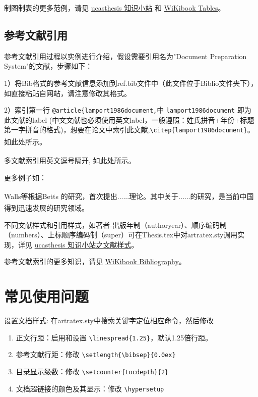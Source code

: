 {制图制表的更多范例，请见 \href{https://github.com/mohuangrui/ucasthesis/wiki}{ucasthesis 知识小站} 和 \href{https://en.wikibooks.org/wiki/LaTeX/Tables}{WiKibook Tables}。

\subsection{参考文献引用}

参考文献引用过程以实例进行介绍，假设需要引用名为"Document Preparation System"的文献，步骤如下：

1）将Bib格式的参考文献信息添加到ref.bib文件中（此文件位于Biblio文件夹下），如直接粘贴自网站，请注意修改其格式。

2）索引第一行 \verb|@article{lamport1986document,|中 \verb|lamport1986document| 即为此文献的label (中文文献也必须使用英文label，一般遵照：姓氏拼音+年份+标题第一字拼音的格式)，想要在论文中索引此文献,\verb|\citep{lamport1986document}|。如此处所示\textsuperscript{\citep{lamport1986document}}。

多文献索引用英文逗号隔开, 如此处所示\textsuperscript{\citep{lamport1986document, chu2004tushu, chen2005zhulu}}。

更多例子如：

Walls等\textsuperscript{\citep{walls2013drought}}根据Betts\textsuperscript{\citep{betts2005aging}} 的研究，首次提出......理论。其中关于......的研究\textsuperscript{}，是当前中国得到迅速发展的研究领域\textsuperscript{\citep{chen1980zhongguo, bravo1990comparative}}。

不同文献样式和引用样式，如著者-出版年制（authoryear）、顺序编码制（numbers）、上标顺序编码制（super）可在Thesis.tex中对artratex.sty调用实现，详见 \href{https://github.com/mohuangrui/ucasthesis/wiki}{ucasthesis 知识小站之文献样式}。


参考文献索引的更多知识，请见 \href{https://en.wikibooks.org/wiki/LaTeX/Bibliography_Management}{WiKibook Bibliography}。\nocite{*}%

\section{常见使用问题}\label{sec:qa}

设置文档样式: 在artratex.sty中搜索关键字定位相应命令，然后修改
\begin{enumerate}
    \item 正文行距：启用和设置 \verb|\linespread{1.25}|，默认1.25倍行距。
    \item 参考文献行距：修改 \verb|\setlength{\bibsep}{0.0ex}|
    \item 目录显示级数：修改 \verb|\setcounter{tocdepth}{2}|
    \item 文档超链接的颜色及其显示：修改 \verb|\hypersetup|
\end{enumerate}

}
